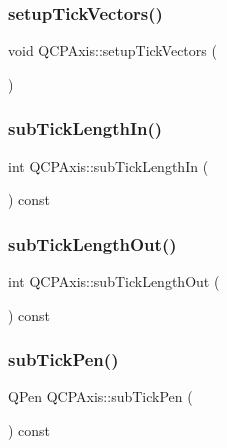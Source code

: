\subsubsection{\texorpdfstring{setup\+Tick\+Vectors()}{setupTickVectors()}}
{\footnotesize\ttfamily void Q\+C\+P\+Axis\+::setup\+Tick\+Vectors (\begin{DoxyParamCaption}{ }\end{DoxyParamCaption})\hspace{0.3cm}{\ttfamily [protected]}}

\mbox{\label{class_q_c_p_axis_af907c8ecc4624d1bf4a8f6f702e64fbe}} 
\subsubsection{\texorpdfstring{sub\+Tick\+Length\+In()}{subTickLengthIn()}}
{\footnotesize\ttfamily int Q\+C\+P\+Axis\+::sub\+Tick\+Length\+In (\begin{DoxyParamCaption}{ }\end{DoxyParamCaption}) const}

\mbox{\label{class_q_c_p_axis_ac98c66cae50c98f3ae90e2969382976d}} 
\subsubsection{\texorpdfstring{sub\+Tick\+Length\+Out()}{subTickLengthOut()}}
{\footnotesize\ttfamily int Q\+C\+P\+Axis\+::sub\+Tick\+Length\+Out (\begin{DoxyParamCaption}{ }\end{DoxyParamCaption}) const}

\mbox{\label{class_q_c_p_axis_a7a89df74ba427fac311bf4cc92fbddca}} 
\subsubsection{\texorpdfstring{sub\+Tick\+Pen()}{subTickPen()}}
{\footnotesize\ttfamily Q\+Pen Q\+C\+P\+Axis\+::sub\+Tick\+Pen (\begin{DoxyParamCaption}{ }\end{DoxyParamCaption}) const\hspace{0.3cm}{\ttfamily [inline]}}

